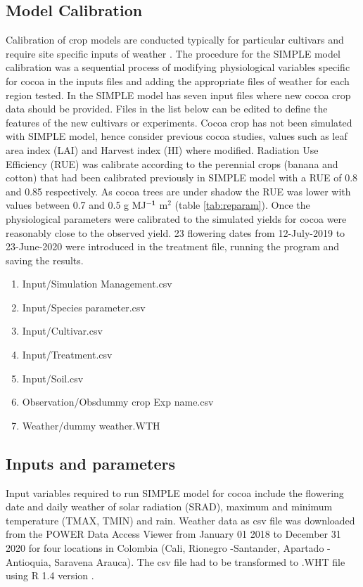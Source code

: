 \documentclass[gene,journal,article,submit,moreauthors,pdftex]{Definitions/mdpi}
\begin{document}
\subsection{Model Calibration}

Calibration of crop models are conducted typically for particular cultivars and require site specific inputs of weather \citep{Crout20142}. The procedure for the SIMPLE model \citep{Zao2019simple} calibration  was a sequential process of modifying physiological variables specific for cocoa in the inputs files and  adding the appropriate files of weather for each region tested. In the SIMPLE model has seven input files where new cocoa crop data should be provided. Files in the list below can be edited to define the features of the new cultivars or experiments. Cocoa crop has not been simulated with SIMPLE model, hence consider previous cocoa studies, values such as leaf area index (LAI) \citep{Agele2016} and Harvest index (HI) \citep{Quintana2015} where modified. Radiation Use Efficiency (RUE) was calibrate according to the perennial crops  (banana and cotton) that had been calibrated previously in SIMPLE model \citep{Zao2019simple} with a RUE of 0.8 and 0.85 respectively. As cocoa trees are under shadow the RUE was lower with values between 0.7 and 0.5 g MJ$^{\mathbf{-1}}$ m$^{2}$ (table \ref{tab:reparam}).
Once the physiological parameters were calibrated to the  simulated yields for cocoa were reasonably close to the observed yield. 23 flowering dates from 12-July-2019 to 23-June-2020 were introduced in the treatment file, running the program and saving the results.  

\begin{enumerate}
	\item Input/Simulation Management.csv
	\item Input/Species parameter.csv
	\item Input/Cultivar.csv
	\item Input/Treatment.csv	
	\item Input/Soil.csv
	\item Observation/Obsdummy crop Exp name.csv	
	\item Weather/dummy weather.WTH
\end{enumerate}


\subsection{Inputs and parameters}
Input variables required to run SIMPLE model for cocoa include the flowering date and daily weather of solar radiation (SRAD), maximum and minimum temperature (TMAX, TMIN) and rain. Weather data as csv file was  downloaded from the POWER Data Access Viewer \citep{nasapower} from January 01 2018 to December 31 2020 for four locations in Colombia (Cali, Rionegro -Santander, Apartado - Antioquia, Saravena Arauca). The csv file had to be transformed to .WHT file using R 1.4 version \citep{Rstudio2020}. 
\end{document}
